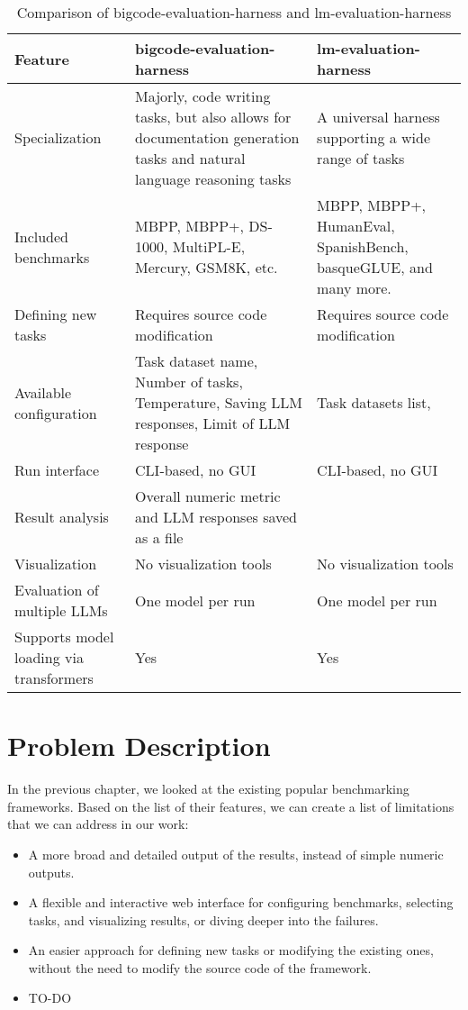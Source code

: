 \begin{table}[H]
    \centering
    \begin{tabular}{|p{4cm}|p{5cm}|p{5cm}|}
        \hline
        \textbf{Feature} & \textbf{bigcode-evaluation-harness} & \textbf{lm-evaluation-harness} \\
        \hline
        Specialization & Majorly, code writing tasks, but also allows for documentation generation tasks and natural language reasoning tasks & A universal harness supporting a wide range of tasks \\
        \hline
        Included benchmarks & MBPP, MBPP+, DS-1000, MultiPL-E, Mercury, GSM8K, etc. & MBPP, MBPP+, HumanEval, SpanishBench, basqueGLUE, and many more. \\
        \hline
        Defining new tasks & Requires source code modification & Requires source code modification \\
        \hline
        Available configuration & Task dataset name, Number of tasks, Temperature, Saving LLM responses, Limit of LLM response & Task datasets list,  \\
        \hline
        Run interface & CLI-based, no GUI & CLI-based, no GUI \\
        \hline
        Result analysis & Overall numeric metric and LLM responses saved as a file &  \\
        \hline
        Visualization & No visualization tools & No visualization tools \\
        \hline
        Evaluation of multiple LLMs & One model per run & One model per run \\
        \hline
        Supports model loading via transformers & Yes & Yes \\
        \hline
    \end{tabular}
    \caption{Comparison of bigcode-evaluation-harness and lm-evaluation-harness}
    \label{tab:framework-comparison}
\end{table}


\chapter{Problem Description}

In the previous chapter, we looked at the existing popular benchmarking frameworks.
Based on the list of their features, we can create a list of limitations that we can address in our work:
\begin{itemize}
    \item A more broad and detailed output of the results, instead of simple numeric outputs.
    \item A flexible and interactive web interface for configuring benchmarks, selecting tasks, and visualizing results, or diving deeper into the failures.
    \item An easier approach for defining new tasks or modifying the existing ones, without the need to modify the source code of the framework.
    \item TO-DO
\end{itemize}

